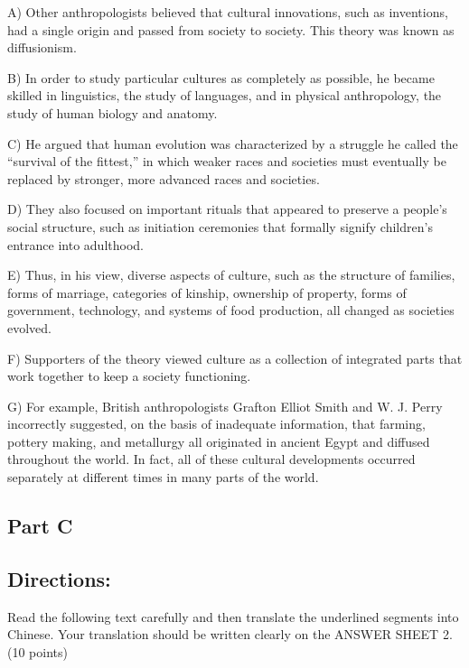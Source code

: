 \documentclass[UTF8,11pt]{ctexart}
\begin{document}
A) Other anthropologists believed that cultural innovations, such as inventions, had a single origin and passed from society to society. This theory was known as diffusionism.


B) In order to study particular cultures as completely as possible, he became skilled in linguistics, the study of languages, and in physical anthropology, the study of human biology and anatomy.


C) He argued that human evolution was characterized by a struggle he called the “survival of the fittest,” in which weaker races and societies must eventually be replaced by stronger, more advanced races and societies.


D) They also focused on important rituals that appeared to preserve a people’s social structure, such as initiation ceremonies that formally signify children’s entrance into adulthood.


E) Thus, in his view, diverse aspects of culture, such as the structure of families, forms of marriage, categories of kinship, ownership of property, forms of government, technology, and systems of food production, all changed as societies evolved.


F) Supporters of the theory viewed culture as a collection of integrated parts that work together to keep a society functioning.


G) For example, British anthropologists Grafton Elliot Smith and W. J. Perry incorrectly suggested, on the basis of inadequate information, that farming, pottery making, and metallurgy all originated in ancient Egypt and diffused throughout the world. In fact, all of these cultural developments occurred separately at different times in many parts of the world.


\subsection*{\textbf{Part C}}


\subsection*{\textbf{Directions:}}


Read the following text carefully and then translate the underlined segments into Chinese. Your translation should be written clearly on the ANSWER SHEET 2. (10 points)
\end{document}
